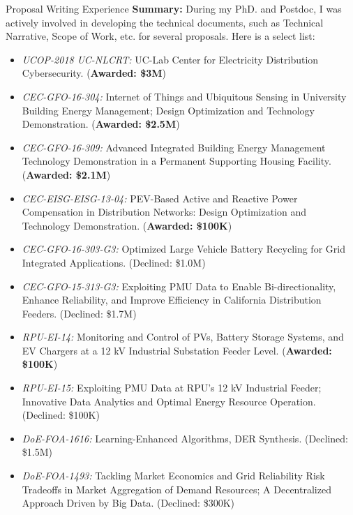 \documentclass{resume} %
\begin{document}
\begin{rSection}{ Proposal Writing Experience}
\textbf{Summary:} During my PhD. and Postdoc, I was actively involved in developing  the technical documents, such as Technical Narrative, Scope of Work, etc. for several proposals. Here is a select list:
\begin{itemize}

\item  \emph{UCOP-2018 UC-NLCRT:} UC-Lab Center for Electricity Distribution Cybersecurity. (\textbf{Awarded: \$3M})

\item  \emph{CEC-GFO-16-304:} Internet of Things and Ubiquitous Sensing in University Building Energy Management; Design Optimization and Technology Demonstration. (\textbf{Awarded: \$2.5M})

\item  \emph{CEC-GFO-16-309:} Advanced Integrated Building Energy Management Technology Demonstration in a Permanent Supporting Housing Facility. (\textbf{Awarded: \$2.1M})

\item  \emph{CEC-EISG-EISG-13-04:} PEV-Based Active and Reactive Power Compensation in Distribution Networks: Design Optimization and Technology Demonstration.  (\textbf{Awarded: \$100K})

\item  \emph{CEC-GFO-16-303-G3:} Optimized Large Vehicle Battery Recycling for Grid Integrated Applications. (Declined: \$1.0M)

\item \emph{CEC-GFO-15-313-G3:} Exploiting PMU Data to Enable Bi-directionality, Enhance Reliability, and Improve Efficiency in California Distribution Feeders. (Declined: \$1.7M)

\item \emph{RPU-EI-14:} Monitoring and Control of PVs, Battery Storage Systems, and EV Chargers at a 12 kV Industrial Substation Feeder Level. (\textbf{Awarded: \$100K})

\item \emph{RPU-EI-15:} Exploiting PMU Data at RPU's 12 kV Industrial Feeder; Innovative Data Analytics and Optimal Energy Resource Operation. (Declined: \$100K)

\item \emph{DoE-FOA-1616:} Learning-Enhanced Algorithms, DER Synthesis. (Declined: \$1.5M)

\item \emph{DoE-FOA-1493:} Tackling Market Economics and Grid Reliability Risk Tradeoffs in Market Aggregation of Demand Resources; A Decentralized Approach Driven by Big Data. (Declined: \$300K)

\end{itemize}


\end{rSection}
\end{document}
